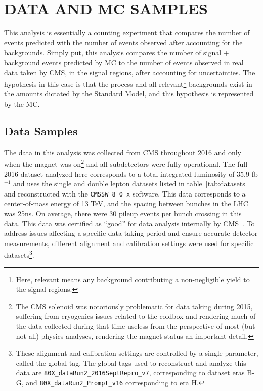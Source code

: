 %
%

\chapter{DATA AND MC SAMPLES}
This analysis is essentially a counting experiment that compares the number of \tth events predicted with the number of events observed after accounting for the backgrounds.
Simply put, this analysis compares the number of signal + background events predicted by MC to the number of events observed in real data taken by CMS, in the signal regions, after accounting for uncertainties. 
The hypothesis in this case is that the \tth process and all relevant\footnote{Here, relevant means any background contributing a non-negligible yield to the signal regions.} backgrounds exist in the amounts dictated by
the Standard Model, and this hypothesis is represented by the MC. 

\section{Data Samples}
The data in this analysis was collected from CMS throughout 2016 and only when the magnet was on\footnote{The CMS solenoid was notoriously problematic for data taking during 2015,
suffering from cryogenics issues related to the coldbox and rendering much of the data collected during that time useless from the perspective of most (but not all) physics analyses,
rendering the magnet status an important detail.} and all subdetectors were fully operational.
The full 2016 dataset analyzed here corresponds to a total integrated luminosity of 35.9 fb$^{-1}$ and uses the single and double lepton datasets listed in table~\ref{tab:datasets}
and reconstructed with the \texttt{CMSSW\_8\_0\_x} software. This data corresponds to a center-of-mass energy of 13 TeV, and the spacing between bunches in the LHC was 25ns.
On average, there were 30 pileup events per bunch crossing in this data. This data was certified as ``good'' for data analysis internally by CMS~\cite{json}.
To address issues affecting a specific data-taking period and ensure accurate detector measurements, different alignment and calibration settings were used for
specific datasets\footnote{These alignment and calibration settings are controlled by a single parameter, called the global tag. The global tags used to reconstruct and analyze this data are
\texttt{80X\_dataRun2\_2016SeptRepro\_v7}, corresponding to dataset eras B-G, and \texttt{80X\_dataRun2\_Prompt\_v16} corresponding to era H.}. 

